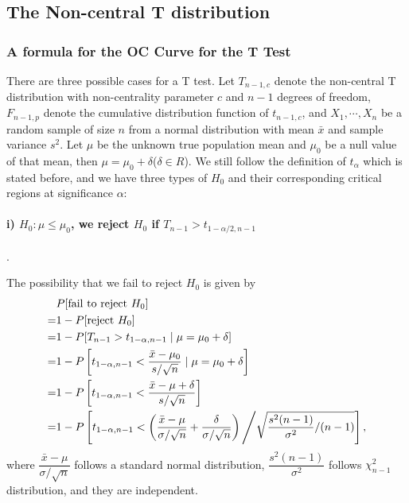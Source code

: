 \documentclass[conf]{new-aiaa}
\begin{document}
\subsection{The Non-central T distribution}

\subsubsection{A formula for the OC Curve for the T Test}

There are three possible cases for a T test. Let $T_{n-1, c}$ denote the non-central T distribution with non-centrality parameter $c$ and $n-1$ degrees of freedom,  $F_{n-1,p}$ denote the cumulative distribution function of $t_{n-1, c}$, and $X_1,\cdots, X_n$ be a random sample of size $n$ from a normal distribution with mean $\bar{x}$ and sample variance $s^2$. Let $\mu$ be the unknown true population mean and $\mu_0$ be a null value of that mean, then $\mu=\mu_0+\delta$($\delta \in R$). We still follow the definition of $t_\alpha$ which is stated before, and we have three types of $H_0$ and their corresponding critical regions at significance $\alpha$:

\paragraph{i) $H_0:\mu\leqslant\mu_0$, we reject $H_0$ if $T_{n-1}>t_{1-\alpha/2,n-1}$}.\ \medskip

The possibility that we fail to reject $H_0$ is given by
\begin{align*}
&P[{\rm fail\ to\ reject\ }H_0]\\
=&1-P[{\rm reject\ }H_0]\\
=&1-P[T_{n-1}>t_{1-\alpha,n-1} \mid \mu=\mu_0+\delta]\\
=&1 - P\left[t_{1-\alpha, n-1} < \frac{\bar{x} - \mu_0}{s/\sqrt{n}} \mid \mu=\mu_0+\delta\right]\\
=&1 - P\left[t_{1-\alpha, n-1} < \frac{\bar{x} - \mu + \delta}{s/\sqrt{n}} \right]\\
=&1 - P\left[t_{1-\alpha, n-1} < \left(\frac{\bar{x} - \mu}{\sigma/\sqrt{n}} + \frac{\delta}{\sigma / \sqrt{n}} \right) \Bigg/ \sqrt{\frac{s^2(n-1)}{\sigma^2}/(n-1)}\right],
\end{align*}
where 
$\dfrac{\bar{x} - \mu}{\sigma/\sqrt{n}}$
follows a standard normal distribution,
$\dfrac{s^2(n-1)}{\sigma^2}$
follows $\chi_{n-1}^2$ distribution, and they are independent. \medskip
\end{document}
